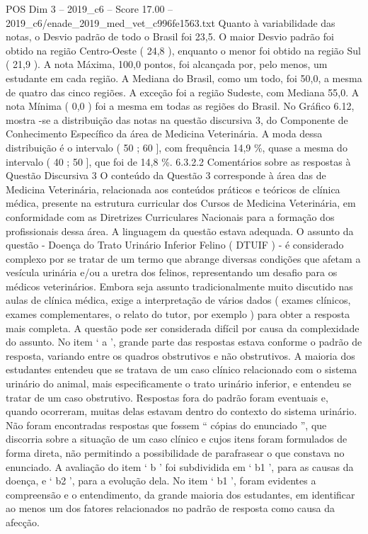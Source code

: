 \begin{textsample}{POS Dim 3 – 2019\_c6 – Score 17.00 – 2019\_c6/enade\_2019\_med\_vet\_c996fe1563.txt}
Quanto à variabilidade das notas, o Desvio padrão de todo o Brasil foi 23,5.
O maior Desvio padrão foi obtido na região Centro-Oeste ( 24,8 ), enquanto o menor foi obtido na região Sul ( 21,9 ).
A nota Máxima, 100,0 pontos, foi alcançada por, pelo menos, um estudante em cada região.
A Mediana do Brasil, como um todo, foi 50,0, a mesma de quatro das cinco regiões.
A exceção foi a região Sudeste, com Mediana 55,0.
A nota Mínima ( 0,0 ) foi a mesma em todas as regiões do Brasil.
No Gráfico 6.12, mostra -se a distribuição das notas na questão discursiva 3, do Componente de Conhecimento Específico da área de Medicina Veterinária.
A moda dessa distribuição é o intervalo ( 50 ; 60 ], com frequência 14,9 \%, quase a mesma do intervalo ( 40 ; 50 ], que foi de 14,8 \%. 6.3.2.2 Comentários sobre as respostas à Questão Discursiva 3 O conteúdo da Questão 3 corresponde à área das de Medicina Veterinária, relacionada aos conteúdos práticos e teóricos de clínica médica, presente na estrutura curricular dos Cursos de Medicina Veterinária, em conformidade com as Diretrizes Curriculares Nacionais para a formação dos profissionais dessa área.
A linguagem da questão estava adequada.
O assunto da questão - Doença do Trato Urinário Inferior Felino ( DTUIF ) - é considerado complexo por se tratar de um termo que abrange diversas condições que afetam a vesícula urinária e/ou a uretra dos felinos, representando um desafio para os médicos veterinários.
Embora seja assunto tradicionalmente muito discutido nas aulas de clínica médica, exige a interpretação de vários dados ( exames clínicos, exames complementares, o relato do tutor, por exemplo ) para obter a resposta mais completa.
A questão pode ser considerada difícil por causa da complexidade do assunto.
No item ‘ a ’, grande parte das respostas estava conforme o padrão de resposta, variando entre os quadros obstrutivos e não obstrutivos.
A maioria dos estudantes entendeu que se tratava de um caso clínico relacionado com o sistema urinário do animal, mais especificamente o trato urinário inferior, e entendeu se tratar de um caso obstrutivo.
Respostas fora do padrão foram eventuais e, quando ocorreram, muitas delas estavam dentro do contexto do sistema urinário.
Não foram encontradas respostas que fossem “ cópias do enunciado ”, que discorria sobre a situação de um caso clínico e cujos itens foram formulados de forma direta, não permitindo a possibilidade de parafrasear o que constava no enunciado.
A avaliação do item ‘ b ’ foi subdividida em ‘ b1 ’, para as causas da doença, e ‘ b2 ’, para a evolução dela.
No item ‘ b1 ’, foram evidentes a compreensão e o entendimento, da grande maioria dos estudantes, em identificar ao menos um dos fatores relacionados no padrão de resposta como causa da afecção.

\end{textsample}
